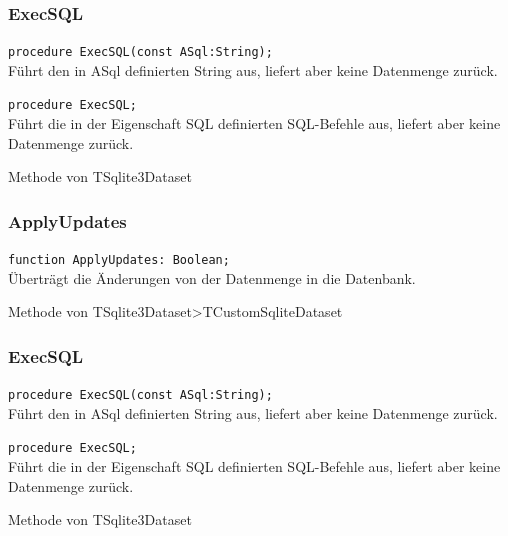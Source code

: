 \subsubsection{ExecSQL}
\begin{description}
  \item \texttt{procedure ExecSQL(const ASql:String);}\\Führt den in ASql definierten String aus, liefert aber keine Datenmenge zurück.
  \item \texttt{procedure ExecSQL;}\\Führt die in der Eigenschaft SQL definierten SQL-Befehle aus, liefert aber keine Datenmenge zurück.
  \begin{description}
    \item Methode von TSqlite3Dataset
  \end{description}
\end{description}

\subsubsection{ApplyUpdates}
\begin{description}
  \item \texttt{function ApplyUpdates: Boolean;}\\Überträgt die Änderungen von der Datenmenge in die Datenbank.
  \begin{description}
    \item Methode von TSqlite3Dataset>TCustomSqliteDataset
  \end{description}
\end{description}

\subsubsection{ExecSQL}
\begin{description}
  \item \texttt{procedure ExecSQL(const ASql:String);}\\Führt den in ASql definierten String aus, liefert aber keine Datenmenge zurück.
  \item \texttt{procedure ExecSQL;}\\Führt die in der Eigenschaft SQL definierten SQL-Befehle aus, liefert aber keine Datenmenge zurück.
  \begin{description}
    \item Methode von TSqlite3Dataset
  \end{description}
\end{description}

